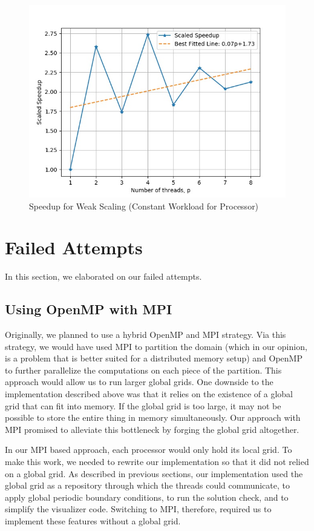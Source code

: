 \documentclass{article}
\begin{document}
\begin{figure}[h!]
	\centering
	\includegraphics[width=0.8\columnwidth]{../weak_scaling_v2.jpg}
	\caption{Speedup for Weak Scaling (Constant Workload for Processor)}
	\label{fig:weak_scaling_v2}
\end{figure}

\section{Failed Attempts}
In this section, we elaborated on our failed attempts. 
\subsection{Using OpenMP with MPI}
Originally, we planned to use a hybrid OpenMP and MPI strategy.
Via this strategy, we would have used MPI to partition the domain (which in our opinion, is a problem that is better suited for a distributed memory setup) 
and OpenMP to further parallelize the computations on each piece of the partition.
This approach would allow us to run larger global grids.
One downside to the implementation described above was that it relies on the existence of a global grid that can fit into memory.
If the global grid is too large, it may not be possible to store the entire thing in memory simultaneously.
Our approach with MPI promised to alleviate this bottleneck by forging the global grid altogether.

In our MPI based approach, each processor would only hold its local grid.
To make this work, we needed to rewrite our implementation so that it did not relied on a global grid.
As described in previous sections, our implementation used the global grid as a repository through which the threads could communicate, to apply global periodic boundary conditions, to run the solution check, and to simplify the visualizer code.
Switching to MPI, therefore, required us to implement these features without a global grid.
\end{document}
